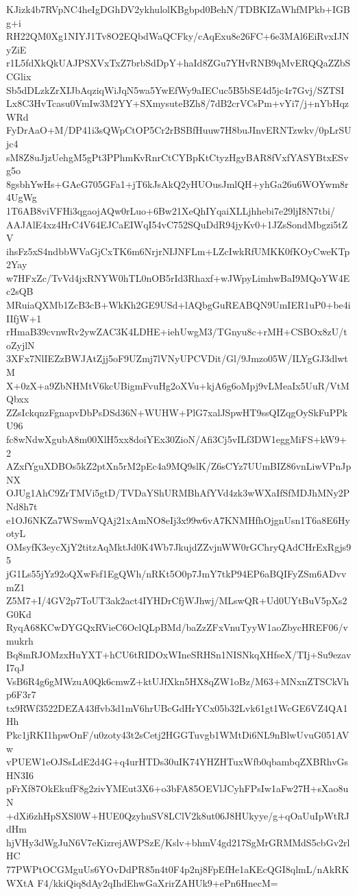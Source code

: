 KJizk4b7RVpNC4heIgDGhDV2ykhulolKBgbpd0BehN/TDBKIZaWhfMPkb+IGBg+i
RH22QM0Xg1NIYJ1Tv8O2EQbdWaQCFky/cAqExu8e26FC+6e3MAl6EiRvxIJNyZiE
r1L5fdXkQkUAJPSXVxTxZ7brbSdDpY+haId8ZGu7YHvRNB9qMvERQQaZZbSCGlix
Sb5dDLzkZrXIJbAqziqWiJqN5wa5YwEfWy9aIECuc5B5bSE4d5jc4r7Gvj/SZTSI
Lx8C3HvTcasu0VmIw3M2YY+SXmysuteBZh8/7dB2crVCsPm+vYi7/j+nYbHqzWRd
FyDrAaO+M/DP41i3sQWpCtOP5Cr2rBSBfHuuw7H8buJInvERNTzwkv/0pLrSUjc4
sM8Z8uJjzUehgM5gPt3PPhmKvRnrCtCYBpKtCtyzHgyBAR8fVxfYASYBtxESvg5o
8gsbhYwHs+GAeG705GFa1+jT6kJsAkQ2yHUOusJmlQH+yhGa26u6WOYwm8r4UgWg
1T6AB8viVFHi3qgaojAQw0rLuo+6Bw21XeQhIYqaiXLLjhhebi7e29ljI8N7tbi/
AAJAlE4xz4HrC4V64EJCaEIWqI54vC752SQuDdR94jyKv0+1JZsSondMbgzi5tZV
ihsFz5xS4ndbbWVaGjCxTK6m6NrjrNIJNFLm+LZcIwkRfUMKK0fKOyCweKTp2Yay
w7HFxZc/TvVd4jxRNYW0hTL0nOB5rId3Rhaxf+wJWpyLimhwBaI9MQoYW4Ec2sQB
MRuiaQXMb1ZcB3cB+WkKh2GE9USd+lAQbgGuREABQN9UmIER1uP0+be4iIIfjW+1
rHmaB39cvnwRv2ywZAC3K4LDHE+iehUwgM3/TGnyu8c+rMH+CSBOx8zU/toZyjlN
3XFx7NlIEZzBWJAtZjj5oF9UZmj7lVNyUPCVDit/Gl/9Jmzo05W/ILYgGJ3dlwtM
X+0zX+a9ZbNHMtV6kcUBigmFvuHg2oXVu+kjA6g6oMpj9vLMeaIx5UuR/VtMQbxx
ZZsIckqnzFgnapvDbPsDSd36N+WUHW+PlG7xalJSpwHT9ssQIZqgOySkFuPPkU96
fc8wNdwXgubA8m00XlH5xx8doiYEx30ZioN/Afi3Cj5vILf3DW1eggMiFS+kW9+2
AZxfYguXDBOs5kZ2ptXn5rM2pEc4a9MQ9slK/Z6sCYz7UUmBIZ86vnLiwVPnJpNX
OJUg1AhC9ZrTMVi5gtD/TVDaYShURMBhAfYVd4zk3wWXaIfSfMDJhMNy2PNd8h7t
e1OJ6NKZa7WSwmVQAj21xAmNO8eIj3x99w6vA7KNMHfhOjgnUsn1T6a8E6HyotyL
OMsyfK3eycXjY2titzAqMktJd0K4Wb7JkujdZZvjnWW0rGChryQAdCHrExRgjs95
jG1Ls55jYz92oQXwFsf1EgQWh/nRKt5O0p7JmY7tkP94EP6aBQIFyZSm6ADvvmZ1
Z5M7+I/4GV2p7ToUT3ak2act4IYHDrCfjWJhwj/MLswQR+Ud0UYtBuV5pXs2G0Kd
RyqA68KCwDYGQxRVieC6OclQLpBMd/baZzZFxVnuTyyW1aoZbycHREF06/vmukrh
Bq8mRJOMzxHuYXT+hCU6tRIDOxWIneSRHSn1NISNkqXHfseX/TIj+Su9ezavI7qJ
VsB6R4g6gMWzuA0Qk6cmwZ+ktUJfXkn5HX8qZW1oBz/M63+MNxnZTSCkVhp6F3r7
tx9RWf3522DEZA43ffvb3d1mV6hrUBcGdHrYCx05b32Lvk61gt1WcGE6VZ4QA1Hh
Pkc1jRKI1hpwOnF/u0zoty43t2sCetj2HGGTuvgb1WMtDi6NL9nBlwUvuG051AVw
vPUEW1eOJSsLdE2d4G+q4urHTDs30uIK74YHZHTuxWfb0qbambqZXBRhvGsHN3I6
pFrXf87OkEkufF8g2zivYMEut3X6+o3bFA85OEVlJCyhFPsIw1aFw27H+sXao8uN
+dXi6zhHpSXSl0W+HUE0QzyhuSV8LClV2k8ut06J8HUkyye/g+qOaUuIpWtRJdHm
hjVHy3dWgJuN6V7eKizrejAWPSzE/Kslv+bhmV4gd217SgMrGRMMdS5cbGv2rlHC
77PWPtOCGMguUs6YOvDdPR85n4t0F4p2nj8FpEfHe1aKEcQGI8qlmL/nAkRKWXtA
F4/kkiQiq8dAy2qIhdEhwGaXrirZAHUk9+ePn6HnecM=
